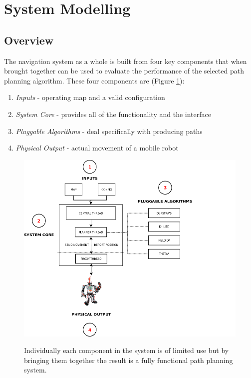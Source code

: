 \newpage


\section{System Modelling}

\subsection{Overview}
\noindent
The navigation system as a whole is built from four key components that when brought together can be used to evaluate the performance of the selected path planning algorithm. These four components are (Figure \ref{overview}):

\begin{enumerate}
\item \textit{Inputs} - operating map and a valid configuration
\item \textit{System Core} - provides all of the functionality and the interface
\item \textit{Pluggable Algorithms} - deal specifically with producing paths
\item \textit{Physical Output} - actual movement of a mobile robot
\end{enumerate}

\begin{figure}[htbp]

\center \includegraphics[width=325pt]{illustrations/overview.png}\\
\caption{Individually each component in the system is of limited use but by bringing them together the result is a fully functional path planning system.} 
\label{overview}

\end{figure}

